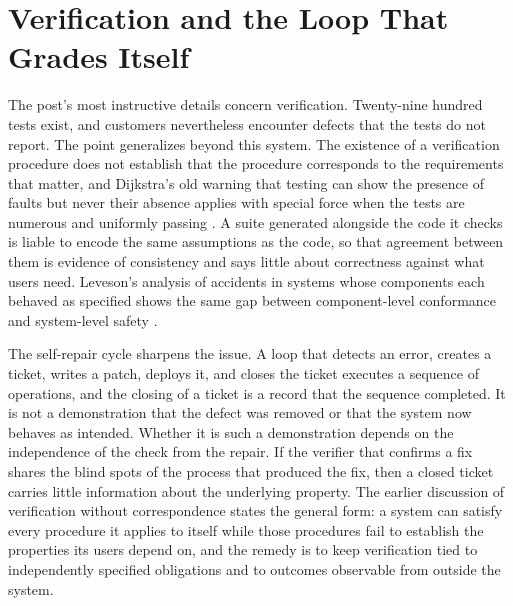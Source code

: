 \documentclass[11pt]{article}
\theoremstyle{remark}
\begin{document}
\section{Verification and the Loop That Grades Itself}

The post's most instructive details concern verification. Twenty-nine hundred tests exist, and customers nevertheless encounter defects that the tests do not report. The point generalizes beyond this system. The existence of a verification procedure does not establish that the procedure corresponds to the requirements that matter, and Dijkstra's old warning that testing can show the presence of faults but never their absence applies with special force when the tests are numerous and uniformly passing \cite{dijkstra1972}. A suite generated alongside the code it checks is liable to encode the same assumptions as the code, so that agreement between them is evidence of consistency and says little about correctness against what users need. Leveson's analysis of accidents in systems whose components each behaved as specified shows the same gap between component-level conformance and system-level safety \cite{leveson2011}.

The self-repair cycle sharpens the issue. A loop that detects an error, creates a ticket, writes a patch, deploys it, and closes the ticket executes a sequence of operations, and the closing of a ticket is a record that the sequence completed. It is not a demonstration that the defect was removed or that the system now behaves as intended. Whether it is such a demonstration depends on the independence of the check from the repair. If the verifier that confirms a fix shares the blind spots of the process that produced the fix, then a closed ticket carries little information about the underlying property. The earlier discussion of verification without correspondence \cite{flyxion_verif} states the general form: a system can satisfy every procedure it applies to itself while those procedures fail to establish the properties its users depend on, and the remedy is to keep verification tied to independently specified obligations and to outcomes observable from outside the system.
\end{document}
